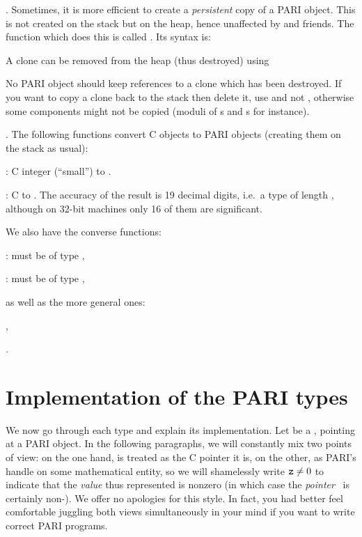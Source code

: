 .\label{se:clone}
Sometimes, it is more efficient to create a \emph{persistent} copy of a PARI
object. This is not created on the stack but on the heap, hence unaffected by
 and friends. The function which does this is called
. Its syntax is:


A clone can be removed from the heap (thus destroyed) using


\noindent No PARI object should keep references to a clone which has been
destroyed. If you want to copy a clone back to the stack then delete it, use
 and not , otherwise some components might not be
copied (moduli of s and s for instance).

.
The following functions convert C objects to PARI objects (creating them on
the stack as usual):

: C  integer  (``small'') to .

: C  to . The accuracy of
the result is 19 decimal digits, i.e.~a type  of length
, although on 32-bit machines only 16 of them are
significant.

\noindent We also have the converse functions:

:  must be of type ,

:  must be of type ,

\noindent as well as the more general ones:

,

.

\section{Implementation of the PARI types}
\label{se:impl}

\noindent
We now go through each type and explain its implementation. Let  be a
, pointing at a PARI object. In the following paragraphs, we will
constantly mix two points of view: on the one hand,  is treated as the
C pointer it is, on the other, as PARI's handle on some mathematical entity,
so we will shamelessly write ${\tt z} \ne 0$ to indicate that the
\emph{value} thus represented is nonzero (in which case the
\emph{pointer}~ is certainly non-). We offer no apologies
for this style. In fact, you had better feel comfortable juggling both views
simultaneously in your mind if you want to write correct PARI programs.

